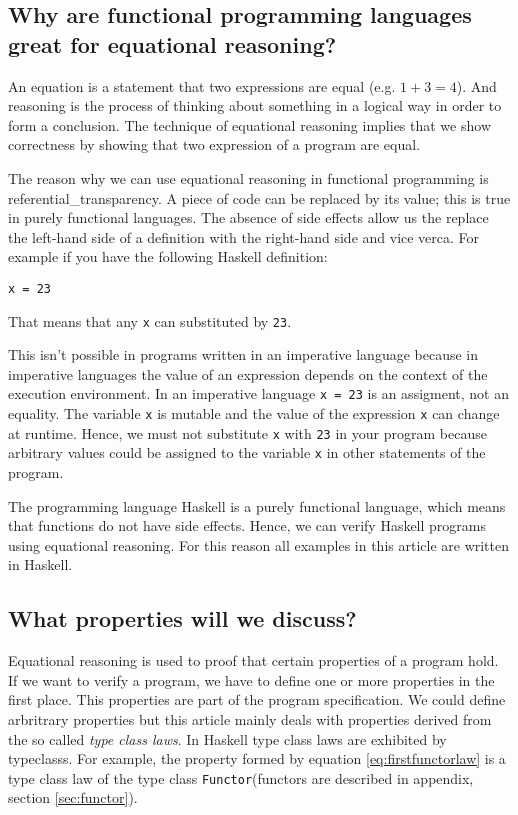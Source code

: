 \subsection{Why are functional programming languages great for equational reasoning?}

An equation is a statement that two expressions are equal (e.g. $1 + 3 = 4$). And reasoning is the process of thinking about something in a logical way in order to form a conclusion. The technique of equational reasoning implies that we show correctness by showing that two expression of a program are equal. 

The reason why we can use equational reasoning in functional programming is \gls{referential_transparency}. A piece of code can be replaced by its value; this is true in purely functional languages. The absence of side effects allow us the replace the left-hand side of a definition with the right-hand side and vice verca. For example if you have the following Haskell definition:
\begin{verbatim}
x = 23
\end{verbatim}
That means that any \verb|x| can substituted by \verb|23|.

This isn't possible in programs written in an imperative language because in imperative languages the value of an expression depends on the context of the execution environment. In an imperative language \verb|x = 23| is an assigment, not an equality. The variable \verb|x| is mutable and the value of the expression \verb|x| can change at runtime. Hence, we must not substitute \verb|x| with \verb|23| in your program because arbitrary values could be assigned to the variable \verb|x| in other statements of the program.

The programming language Haskell is a purely functional language, which means that functions do not have side effects. Hence, we can verify Haskell programs using equational reasoning. For this reason all examples in this article are written in Haskell.

\subsection{What properties will we discuss?}

Equational reasoning is used to proof that certain properties of a program hold. If we want to verify a program, we have to define one or more properties in the first place. This properties are part of the program specification. We could define arbritrary properties but this article mainly deals with properties derived from the so called \emph{type class laws}. In Haskell type class laws are exhibited by \glspl{typeclass}. For example, the property formed by equation \ref{eq:firstfunctorlaw} is a type class law of the type class \verb|Functor|(functors are described in appendix, section \ref{sec:functor}).

